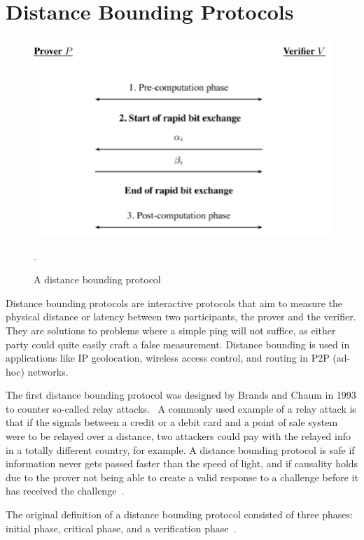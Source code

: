 \section{Distance Bounding Protocols}
\begin{figure}
  \includegraphics[width=\textwidth]{pictures/distance_bounding.png}
  \caption{A distance bounding protocol~\cite{Peeters2011-dq}}.
  \label{Distance Bounding Protocol}
\end{figure}
Distance bounding protocols are interactive protocols that aim to measure the physical distance or latency between two participants, the prover and the verifier. They are solutions to problems where a simple ping will not suffice, as either party could quite easily craft a false measurement. Distance bounding is used in applications like IP geolocation, wireless access control, and routing in P2P (ad-hoc) networks.

The first distance bounding protocol was designed by Brands and Chaum in 1993 to counter so-called relay attacks.~\cite{Boureanu_undated-bn, Brands1994-hz} A commonly used example of a relay attack is that if the signals between a credit or a debit card and a point of sale system were to be relayed over a distance, two attackers could pay with the relayed info in a totally different country, for example. A distance bounding protocol is safe if information never gets passed faster than the speed of light, and if causality holds due to the prover not being able to create a valid response to a challenge before it has received the challenge~\cite{Boureanu_undated-bn}.

The original definition of a distance bounding protocol consisted of three phases: initial phase, critical phase, and a verification phase~\cite{Brands1994-hz, Mauw2018-uz}.

